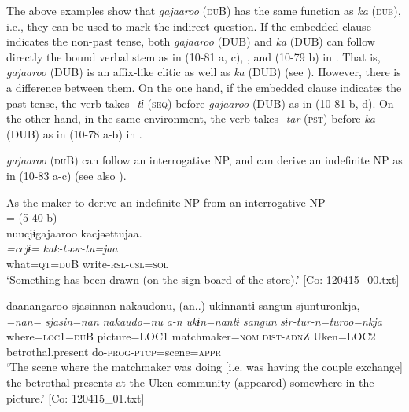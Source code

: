 The above examples show that \textit{gajaaroo} (\textsc{du}B) has the same function as \textit{ka} (\textsc{dub}), i.e., they can be used to mark the indirect question. If the embedded clause indicates the non-past tense, both \textit{gajaaroo} (DUB) and \textit{ka} (DUB) can follow directly the bound verbal stem as in (10-81 a, c), , and (10-79 b) in . That is, \textit{gajaaroo} (DUB) is an affix-like clitic as well as \textit{ka} (DUB) (see ). However, there is a difference between them. On the one hand, if the embedded clause indicates the past tense, the verb takes \textit{{}-tɨ} (\textsc{seq}) before \textit{gajaaroo} (DUB) as in (10-81 b, d). On the other hand, in the same environment, the verb takes \textit{{}-tar} (\textsc{pst}) before \textit{ka} (DUB) as in (10-78 a-b) in .

  \textit{gajaaroo} (\textsc{du}B) can follow an interrogative NP, and can derive an indefinite NP as in (10-83 a-c) (see also ).

\ea\label{ex:10.83}   As the maker to derive an indefinite NP from an interrogative NP\\
  \ea{} = (5-40 b)\\
      \glll    nuucjɨgajaaroo  kacjəəttujaa.\\
      \textit{=ccjɨ=}  \textit{kak-təər-tu=jaa}\\
      what=\textsc{qt}=\textsc{du}B  write-\textsc{rsl}-\textsc{csl}=\textsc{sol}\\
      \glt       ‘Something has been drawn (on the sign board of the store).’ [Co: 120415\_00.txt]

  \ex  %
      \glll    daanangaroo  sjasinnan  {\textbar}nakaudo{\textbar}nu,  (an..)  ukɨnnantɨ  sangun  sjunturonkja,\\
      \textit{=nan=}  \textit{sjasin=nan}  \textit{nakaudo=nu}  \textit{a-n}  \textit{ukɨn=nantɨ}  \textit{sangun}  \textit{sɨr-tur-n=turoo=nkja}\\
      where=\textsc{loc}1=\textsc{du}B  picture=LOC1  matchmaker=\textsc{nom}  \textsc{dist}-\textsc{adn}Z  Uken=LOC2  betrothal.present  do-\textsc{prog}-\textsc{ptcp}=scene=\textsc{appr}\\
      \glt       ‘The scene where the matchmaker was doing [i.e. was having the couple exchange] the betrothal presents at the Uken community (appeared) somewhere in the picture.’ [Co: 120415\_01.txt]

